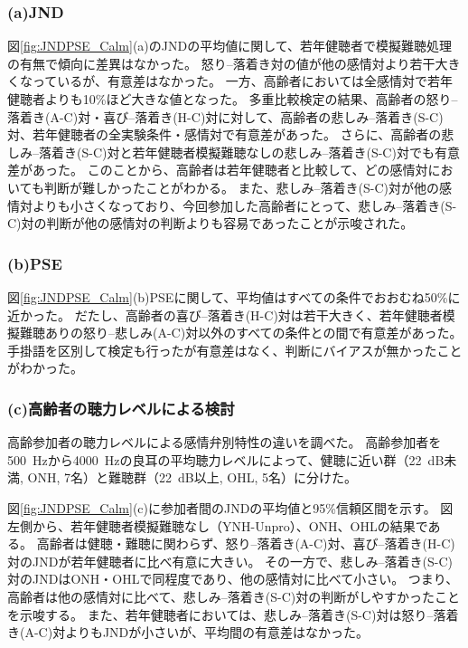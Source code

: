 \subsubsection{(a)JND}
図\ref{fig:JNDPSE_Calm}(a)のJNDの平均値に関して、若年健聴者で模擬難聴処理の有無で傾向に差異はなかった。
怒り--落着き対の値が他の感情対より若干大きくなっているが、有意差はなかった。
一方、高齢者においては全感情対で若年健聴者よりも10\%ほど大きな値となった。
多重比較検定の結果、高齢者の怒り--落着き(A-C)対・喜び--落着き(H-C)対に対して、高齢者の悲しみ--落着き(S-C)対、若年健聴者の全実験条件・感情対で有意差があった。
さらに、高齢者の悲しみ--落着き(S-C)対と若年健聴者模擬難聴なしの悲しみ--落着き(S-C)対でも有意差があった。 
このことから、高齢者は若年健聴者と比較して、どの感情対においても判断が難しかったことがわかる。
また、悲しみ--落着き(S-C)対が他の感情対よりも小さくなっており、今回参加した高齢者にとって、悲しみ--落着き(S-C)対の判断が他の感情対の判断よりも容易であったことが示唆された。


\subsubsection{(b)PSE}
図\ref{fig:JNDPSE_Calm}(b)PSEに関して、平均値はすべての条件でおおむね50\%に近かった。
だたし、高齢者の喜び--落着き(H-C)対は若干大きく、若年健聴者模擬難聴ありの怒り--悲しみ(A-C)対以外のすべての条件との間で有意差があった。
手掛語を区別して検定も行ったが有意差はなく、判断にバイアスが無かったことがわかった。


\subsubsection{(c)高齢者の聴力レベルによる検討}
高齢参加者の聴力レベルによる感情弁別特性の違いを調べた。
高齢参加者を500~Hzから4000~Hzの良耳の平均聴力レベルによって、健聴に近い群（22~dB未満, ONH, 7名）と難聴群（22~dB以上, OHL, 5名）に分けた。

図\ref{fig:JNDPSE_Calm}(c)に参加者間のJNDの平均値と95\%信頼区間を示す。
図左側から、若年健聴者模擬難聴なし（YNH-Unpro）、ONH、OHLの結果である。
高齢者は健聴・難聴に関わらず、怒り--落着き(A-C)対、喜び--落着き(H-C)対のJNDが若年健聴者に比べ有意に大きい。
その一方で、悲しみ--落着き(S-C)対のJNDはONH・OHLで同程度であり、他の感情対に比べて小さい。
つまり、高齢者は他の感情対に比べて、悲しみ--落着き(S-C)対の判断がしやすかったことを示唆する。
また、若年健聴者においては、悲しみ--落着き(S-C)対は怒り--落着き(A-C)対よりもJNDが小さいが、平均間の有意差はなかった。

